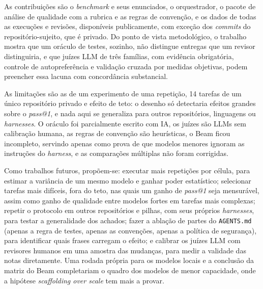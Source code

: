 As contribuições são o \textit{benchmark} e seus enunciados, o orquestrador, o
pacote de análise de qualidade com a rubrica e as regras de convenção, e os
dados de todas as execuções e revisões, disponíveis publicamente, com exceção
dos \textit{commits} do repositório-sujeito, que é privado. Do ponto de vista
metodológico, o trabalho mostra que um oráculo de testes, sozinho, não
distingue entregas que um revisor distinguiria, e que juízes LLM de três
famílias, com evidência obrigatória, controle de autopreferência e validação
cruzada por medidas objetivas, podem preencher essa lacuna com concordância
substancial.

As limitações são as de um experimento de uma repetição, 14 tarefas de um
único repositório privado e efeito de teto: o desenho só detectaria efeitos
grandes sobre o \textit{pass@1}, e nada aqui se generaliza para outros
repositórios, linguagens ou \textit{harnesses}. O oráculo foi parcialmente
escrito com IA, os juízes são LLMs sem calibração humana, as regras de
convenção são heurísticas, o Beam ficou incompleto, servindo apenas como prova de que modelos menores ignoram as instruções do \textit{harness}, e as comparações múltiplas não foram corrigidas.

Como trabalhos futuros, propõem-se: executar mais repetições por célula, para
estimar a variância de um mesmo modelo e ganhar poder estatístico; selecionar
tarefas mais difíceis, fora do teto, nas quais um ganho de \textit{pass@1} seja
mensurável, assim como ganho de qualidade entre modelos fortes em tarefas mais complexas; repetir o protocolo em outros repositórios e pilhas, com seus
próprios \textit{harnesses}, para testar a generalidade dos achados; fazer a
ablação de partes do \texttt{AGENTS.md} (apenas a regra de testes, apenas as
convenções, apenas a política de segurança), para identificar quais frases
carregam o efeito; e calibrar os juízes LLM com revisores humanos em uma
amostra das mudanças, para medir a validade das notas diretamente. Uma rodada
própria para os modelos locais e a conclusão da
matriz do Beam completariam o quadro dos modelos de menor capacidade, onde a
hipótese \textit{scaffolding over scale} tem mais a provar.
